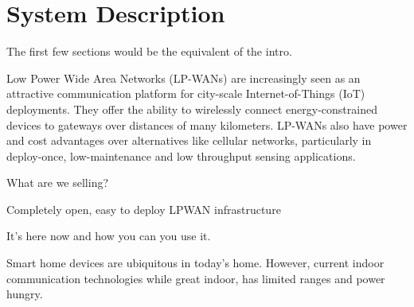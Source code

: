 \documentclass[conference]{IEEEtran}
\begin{document}
\IEEEpeerreviewmaketitle







\section{System Description}
\label{sec:system}

{\color{red} The first few sections would be the equivalent of the intro.}

Low Power Wide Area Networks (LP-WANs) are increasingly seen as an attractive
communication platform for city-scale Internet-of-Things (IoT) deployments.
They offer the ability to wirelessly connect energy-constrained devices to
gateways over distances of many kilometers. LP-WANs also have power and cost
advantages over alternatives like cellular networks, particularly in
deploy-once, low-maintenance and low throughput sensing applications.

What are we selling?


Completely open, easy to deploy LPWAN infrastructure

It's here now and how you can you use it.


Smart home devices are ubiquitous in today's home. However, current indoor
communication technologies while great indoor, has limited ranges and power
hungry.
\end{document}
